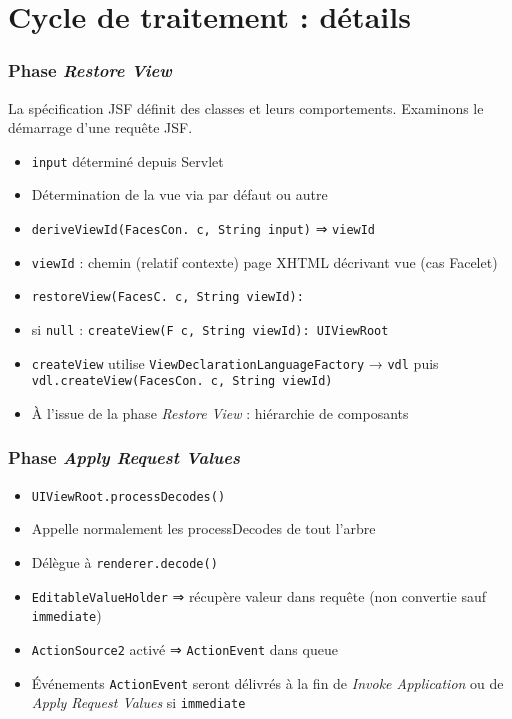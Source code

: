 \documentclass[english, french]{beamer}
\begin{document}
\section{Cycle de traitement : détails}
\begin{frame}[label=ph-rv-details]
	\frametitle{Phase \emph{Restore View}}
	La spécification JSF définit des classes et leurs comportements. Examinons le démarrage d’une requête JSF.
	\begin{itemize}
		\item \texttt{input} déterminé depuis Servlet %
		\item Détermination de la vue via  par défaut {\tiny ou autre}
		\item \texttt{deriveViewId(FacesCon. c, String input)} ⇒ \texttt{viewId}
		\item \texttt{viewId} : chemin {\tiny (relatif contexte)} page XHTML décrivant vue {\tiny (cas Facelet)}
		\item \texttt{restoreView(FacesC. c, String viewId): }
		\item si \texttt{null} : \texttt{createView(F c, String viewId): UIViewRoot}
		\item \texttt{createView} utilise \texttt{ViewDeclarationLanguageFactory} → \texttt{vdl} puis \texttt{vdl.createView(FacesCon. c, String viewId)}
		\item À l’issue de la phase \emph{Restore View} : hiérarchie de composants
	\end{itemize}
\end{frame}

\begin{frame}[label=ph-arv-details]
	\frametitle{Phase \emph{Apply Request Values}}
	\begin{itemize}
		\item \texttt{UIViewRoot.processDecodes()}
		\item Appelle {\tiny normalement} les processDecodes de tout l’arbre
		\item Délègue à \texttt{renderer.decode()}%
		\item \texttt{EditableValueHolder} ⇒ récupère valeur dans requête (non convertie {\tiny sauf \texttt{immediate}})
		\item \texttt{ActionSource2} activé ⇒ \texttt{ActionEvent} dans queue
		\item Événements \texttt{ActionEvent} seront délivrés à la fin de \emph{Invoke Application} {\tiny ou de \emph{Apply Request Values} si \texttt{immediate}}
	\end{itemize}
\end{frame}
\end{document}
